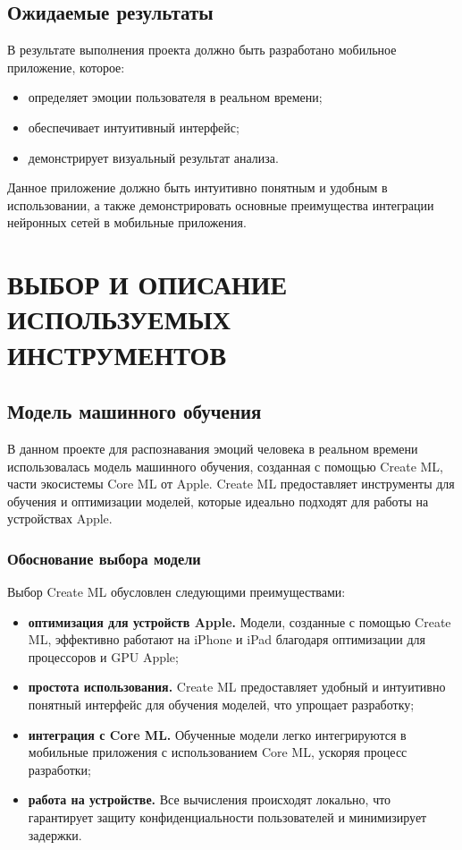 {\subsection*{Ожидаемые результаты}
В результате выполнения проекта должно быть разработано мобильное приложение, которое:
\begin{itemize}
    \item определяет эмоции пользователя в реальном времени;
    \item обеспечивает интуитивный интерфейс;
    \item демонстрирует визуальный результат анализа.
\end{itemize}

Данное приложение должно быть интуитивно понятным и удобным в использовании, а также демонстрировать основные преимущества интеграции нейронных сетей в мобильные приложения.

\newpage
  
\section{\MakeUppercase{Выбор и описание используемых инструментов}}
{
    \subsection{Модель машинного обучения}
    В данном проекте для распознавания эмоций человека в реальном времени использовалась модель машинного обучения, созданная с помощью Create ML, части экосистемы Core ML от Apple. Create ML предоставляет инструменты для обучения и оптимизации моделей, которые идеально подходят для работы на устройствах Apple.

\subsubsection*{Обоснование выбора модели}
Выбор Create ML обусловлен следующими преимуществами:
\begin{itemize}
    \item \textbf{оптимизация для устройств Apple.} Модели, созданные с помощью Create ML, эффективно работают на iPhone и iPad благодаря оптимизации для процессоров и GPU Apple;
    \item \textbf{простота использования.} Create ML предоставляет удобный и интуитивно понятный интерфейс для обучения моделей, что упрощает разработку;
    \item \textbf{интеграция с Core ML.} Обученные модели легко интегрируются в мобильные приложения с использованием Core ML, ускоряя процесс разработки;
    \item \textbf{работа на устройстве.} Все вычисления происходят локально, что гарантирует защиту конфиденциальности пользователей и минимизирует задержки.
\end{itemize}

}}
